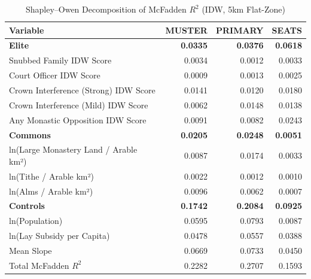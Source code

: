 \begin{table}[H]
\centering
\caption{Shapley--Owen Decomposition of McFadden $R^2$ (IDW, 5km Flat-Zone)}
\label{tab:shapley_owen_idw}
\begin{tabular}{lrrr}
\hline\hline
Variable & MUSTER & PRIMARY & SEATS \\
\hline
\textbf{Elite} & \textbf{0.0335} & \textbf{0.0376} & \textbf{0.0618} \\
\quad Snubbed Family IDW Score & 0.0034 & 0.0012 & 0.0033 \\
\quad Court Officer IDW Score & 0.0009 & 0.0013 & 0.0025 \\
\quad Crown Interference (Strong) IDW Score & 0.0141 & 0.0120 & 0.0180 \\
\quad Crown Interference (Mild) IDW Score & 0.0062 & 0.0148 & 0.0138 \\
\quad Any Monastic Opposition IDW Score & 0.0091 & 0.0082 & 0.0243 \\
\textbf{Commons} & \textbf{0.0205} & \textbf{0.0248} & \textbf{0.0051} \\
\quad ln(Large Monastery Land / Arable km²) & 0.0087 & 0.0174 & 0.0033 \\
\quad ln(Tithe / Arable km²) & 0.0022 & 0.0012 & 0.0010 \\
\quad ln(Alms / Arable km²) & 0.0096 & 0.0062 & 0.0007 \\
\textbf{Controls} & \textbf{0.1742} & \textbf{0.2084} & \textbf{0.0925} \\
\quad ln(Population) & 0.0595 & 0.0793 & 0.0087 \\
\quad ln(Lay Subsidy per Capita) & 0.0478 & 0.0557 & 0.0388 \\
\quad Mean Slope & 0.0669 & 0.0733 & 0.0450 \\
\hline
Total McFadden $R^2$ & 0.2282 & 0.2707 & 0.1593 \\
\hline\hline
\end{tabular}
\end{table}
